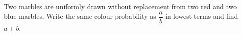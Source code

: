 Two marbles are uniformly drawn without replacement from two red and two blue marbles. Write the same-colour probability as $\dfrac{a}{b}$ in lowest terms and find $a+b$.
